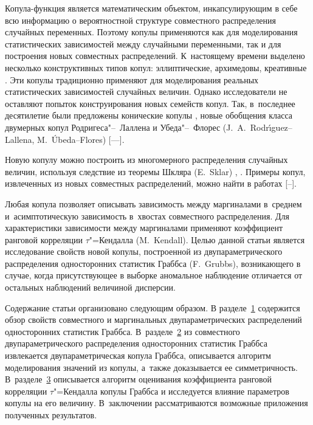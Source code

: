 Копула-функция является математическим объектом, инкапсулирующим в себе всю информацию о вероятностной структуре совместного распределения случайных переменных. 
Поэтому копулы применяются как для моделирования  статистических зависимостей  между случайными переменными, так и для построения новых совместных распределений.
К~настоящему времени выделено несколько конструктивных типов копул: эллиптические, архимедовы,  креативные \cite{Bl}. 
Эти копулы традиционно применяют для моделирования реальных статистических зависимостей случайных величин.
Однако исследователи не оставляют попыток конструирования новых семейств копул. 
Так, в~последнее десятилетие были предложены  конические копулы  \cite{ Jwaid}, новые обобщения     класса двумерных копул Родригеса"--~Лаллена и Убеда"--~Флорес (J.~A.~Rodr\'{\i}guez--Lallena, M.~\'Ubeda--Flores) [---].

  Новую копулу можно построить из многомерного распределения случайных величин, используя следствие из теоремы Шкляра (E.~Sklar) \cite[p.~22, Corollary 2.3.7]{Nelsen}, \cite{Fant}. 
  Примеры копул, извлеченных из   новых совместных распределений, можно найти в работах [--].

 Любая копула позволяет описывать зависимость между маргиналами \linebreak в~среднем  и~асимптотическую зависимость в~хвостах совместного распределения.
Для характеристики зависимости между маргиналами применяют коэффициент ранговой корреляции $\tau$"=Кендалла (M.~Kendall).
Целью данной статьи является исследование свойств новой копулы, построенной из двупараметрического распределения односторонних статистик Граббса (F.~Grubbs),
возникающего в случае, когда присутствующее в выборке  аномальное наблюдение отличается от остальных наблюдений  величиной дисперсии.

Содержание статьи организовано следующим образом. В разделе~\hyperlink{shir:1}{1}  содержится обзор свойств совместного  и
 маргинальных двупараметрических  распределений  односторонних статистик Граббса. 
В~разделе~\hyperlink{shir:2}{2}   из совместного двупараметрического распределения односторонних статистик Граббса извлекается двупараметрическая копула Граббса, описывается алгоритм моделирования значений из копулы, а~также доказывается ее симметричность.
В~разделе~\hyperlink{shir:3}{3}  описывается алгоритм оценивания коэффициента ранговой корреляции $\tau$"=Кендалла копулы Граббса и исследуется влияние параметров копулы на его величину.
В~заключении рассматриваются возможные приложения полученных результатов.
 
